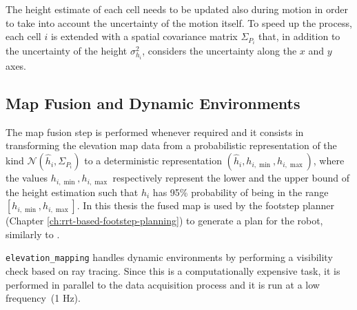 The height estimate of each cell needs to be updated also during motion in 
order to take  
into account the uncertainty of the motion itself. To speed up the process,
each cell $i$ is extended with a spatial covariance matrix $\Sigma_{P_i}$ that,
in addition to the uncertainty of the height $\sigma_{h_i}^2$,
considers the uncertainty along the $x$ and $y$ axes.

\subsection{Map Fusion and Dynamic Environments}
The map fusion step is performed whenever required and it consists in 
transforming the elevation map data from a probabilistic representation of the 
kind $\mathcal{N}(\hat{h}_i, \Sigma_{P_i})$ to a deterministic representation 
$(\hat{h}_i, h_{i,\min}, h_{i,\max})$, where the values $h_{i,\min}, h_{i,\max}$
respectively represent the lower and the upper bound of the height estimation 
such that $h_i$ has 95\% probability of being in the range $[h_{i,\min},
h_{i,\max}]$. In this thesis the fused map is used by the footstep planner 
(Chapter \ref{ch:rrt-based-footstep-planning}) to generate a plan for the robot,
similarly to \cite{Fankauser2018RobustRoughTerrainLocomotion}.

\texttt{elevation\_mapping} handles dynamic environments by performing a 
visibility check based on ray tracing. Since this is a computationally 
expensive task, it is performed in parallel to the data acquisition process and 
it is run at a low frequency~(1 Hz).

